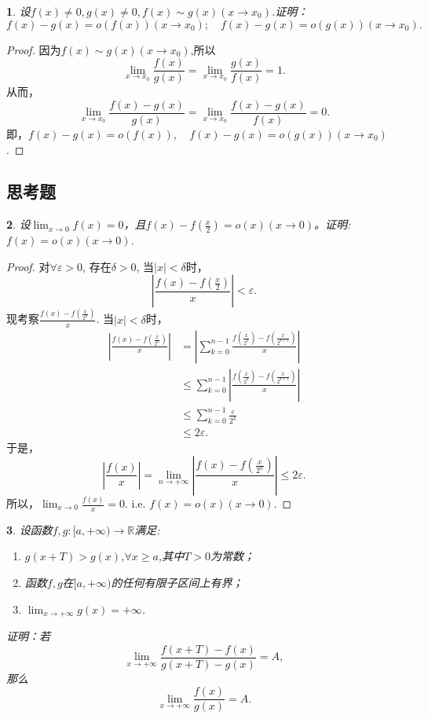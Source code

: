 \documentclass[utf8]{book}
\newtheorem{example}{}[section]             %
\begin{document}
\begin{example}
设$f(x)\neq 0, g(x)\neq 0, f(x)\sim g(x)(x\to x_0)$.证明：$$f(x)-g(x)=o(f(x))(x\to x_0);\quad f(x)-g(x)=o(g(x))(x\to x_0).$$
\end{example}
\begin{proof}因为$f(x)\sim g(x)(x\to x_0)$,所以
$$\displaystyle\lim_{x\to x_0}\frac{f(x)}{g(x)}=\displaystyle\lim_{x\to x_0}\frac{g(x)}{f(x)}=1.$$
从而，
$$\displaystyle\lim_{x\to x_0}\frac{f(x)-g(x)}{g(x)}=\displaystyle\lim_{x\to x_0}\frac{f(x)-g(x)}{f(x)}=0.$$
即，$f(x)-g(x)=o(f(x)),\quad f(x)-g(x)=o(g(x))(x\to x_0)$.
\end{proof}
\subsection{思考题}
\begin{example}
设$\displaystyle\lim_{x\to 0}f(x)=0$，且$f(x)-f(\frac{x}{2})=o(x)(x\to 0)$。证明:$f(x)=o(x)(x\to 0)$.
\end{example}
\begin{proof}对$\forall \varepsilon >0$, 存在$\delta>0$, 当$|x| < \delta$时，
$$\left|\frac{f(x)-f(\frac{x}{2})}{x}\right| < \varepsilon.$$
现考察$\displaystyle\frac{f(x)-f(\frac{x}{2^n})}{x}$. 当$|x| < \delta$时，
\begin{equation*}
\begin{split}
\left|\displaystyle\frac{f(x)-f(\frac{x}{2^n})}{x}\right|&=\left|\displaystyle\sum_{k=0}^{n-1}\frac{f(\frac{x}{2^k})-f(\frac{x}{2^{k+1}})}{x}\right|\\&\leq\displaystyle\sum_{k=0}^{n-1}\left|\frac{f(\frac{x}{2^k})-f(\frac{x}{2^{k+1}})}{x}\right|\\&\leq\displaystyle\sum_{k=0}^{n-1}\frac{\varepsilon}{2^k}\\&\leq 2\varepsilon.
\end{split}
\end{equation*}
于是，$$\left|\frac{f(x)}{x}\right|=\displaystyle\lim_{n\to +\infty}\left|\displaystyle\frac{f(x)-f(\frac{x}{2^n})}{x}\right|\leq 2\varepsilon.$$
所以，$\displaystyle\lim_{x\to 0}\frac{f(x)}{x} = 0$. i.e. $f(x)=o(x)(x\to 0)$.
\end{proof}
\begin{example}
设函数$f,g:[a,+\infty)\rightarrow \mathbb{R}$满足:
\renewcommand\labelenumi{\normalfont(\theenumi)}
\begin{enumerate}
\item $g(x+T)>g(x)$,$\forall x\geq a$,其中$T>0$为常数；
\item 函数$f,g$在$[a,+\infty)$的任何有限子区间上有界；
\item $\displaystyle\lim_{x\to +\infty}g(x)=+\infty$.
\end{enumerate}
证明：若$$\displaystyle\lim_{x\to +\infty}\frac{f(x+T)-f(x)}{g(x+T)-g(x)}=A,$$
那么$$\displaystyle\lim_{x\to +\infty}\frac{f(x)}{g(x)}=A.$$
\end{example}
\end{document}
